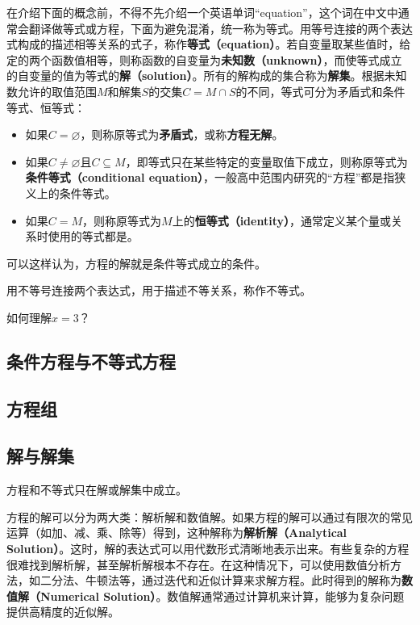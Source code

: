 在介绍下面的概念前，不得不先介绍一个英语单词“equation”，这个词在中文中通常会翻译做等式或方程，下面为避免混淆，统一称为等式。用等号连接的两个表达式构成的描述相等关系的式子，称作\textbf{等式（equation）}。若自变量取某些值时，给定的两个函数值相等，则称函数的自变量为\textbf{未知数（unknown）}，而使等式成立的自变量的值为等式的\textbf{解（solution）}。所有的解构成的集合称为\textbf{解集}。根据未知数允许的取值范围$M$和解集$S$的交集$C=M\cap S$的不同，等式可分为矛盾式和条件等式、恒等式：
\begin{itemize}
\item 如果$C=\varnothing$，则称原等式为\textbf{矛盾式}，或称\textbf{方程无解}。
\item 如果$C\neq\varnothing$且$C\subseteq M$，即等式只在某些特定的变量取值下成立，则称原等式为\textbf{条件等式（conditional equation）}，一般高中范围内研究的“方程”都是指狭义上的条件等式。
\item 如果$C=M$，则称原等式为$M$上的\textbf{恒等式（identity）}，通常定义某个量或关系时使用的等式都是。
\end{itemize}

可以这样认为，方程的解就是条件等式成立的条件。







用不等号连接两个表达式，用于描述不等关系，称作不等式。%

如何理解$x=3$？

\subsection{条件方程与不等式方程}


\subsection{方程组}

\subsection{解与解集}

方程和不等式只在解或解集中成立。

方程的解可以分为两大类：解析解和数值解。如果方程的解可以通过有限次的常见运算（如加、减、乘、除等）得到，这种解称为\textbf{解析解（Analytical Solution）}。这时，解的表达式可以用代数形式清晰地表示出来。有些复杂的方程很难找到解析解，甚至解析解根本不存在。在这种情况下，可以使用数值分析方法，如二分法、牛顿法等，通过迭代和近似计算来求解方程。此时得到的解称为\textbf{数值解（Numerical Solution）}。数值解通常通过计算机来计算，能够为复杂问题提供高精度的近似解。

